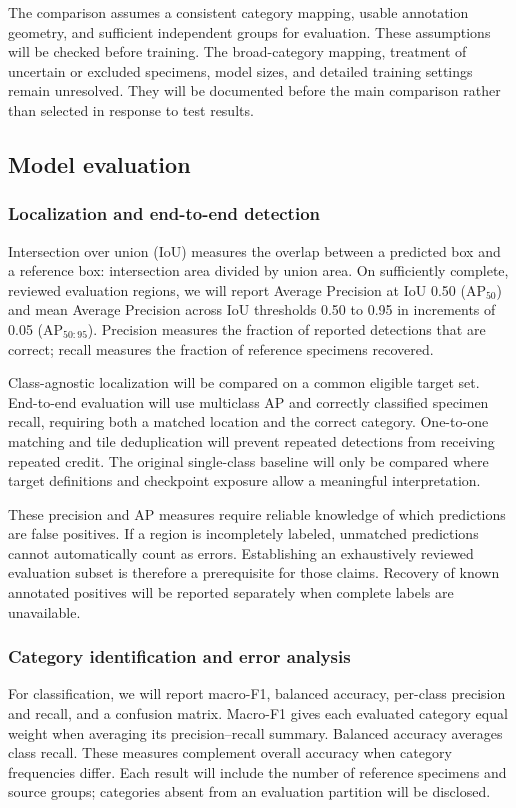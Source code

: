 \documentclass[11pt,letterpaper]{article}
\begin{document}
The comparison assumes a consistent category mapping, usable annotation geometry, and sufficient independent groups for evaluation. These assumptions will be checked before training. The broad-category mapping, treatment of uncertain or excluded specimens, model sizes, and detailed training settings remain unresolved. They will be documented before the main comparison rather than selected in response to test results.

\subsection{Model evaluation}
\subsubsection{Localization and end-to-end detection}
Intersection over union (IoU) measures the overlap between a predicted box and a reference box: intersection area divided by union area. On sufficiently complete, reviewed evaluation regions, we will report Average Precision at IoU 0.50 ($\mathrm{AP}_{50}$) and mean Average Precision across IoU thresholds 0.50 to 0.95 in increments of 0.05 ($\mathrm{AP}_{50:95}$). Precision measures the fraction of reported detections that are correct; recall measures the fraction of reference specimens recovered.

Class-agnostic localization will be compared on a common eligible target set. End-to-end evaluation will use multiclass AP and correctly classified specimen recall, requiring both a matched location and the correct category. One-to-one matching and tile deduplication will prevent repeated detections from receiving repeated credit. The original single-class baseline will only be compared where target definitions and checkpoint exposure allow a meaningful interpretation.

These precision and AP measures require reliable knowledge of which predictions are false positives. If a region is incompletely labeled, unmatched predictions cannot automatically count as errors. Establishing an exhaustively reviewed evaluation subset is therefore a prerequisite for those claims. Recovery of known annotated positives will be reported separately when complete labels are unavailable.

\subsubsection{Category identification and error analysis}
For classification, we will report macro-F1, balanced accuracy, per-class precision and recall, and a confusion matrix. Macro-F1 gives each evaluated category equal weight when averaging its precision--recall summary. Balanced accuracy averages class recall. These measures complement overall accuracy when category frequencies differ. Each result will include the number of reference specimens and source groups; categories absent from an evaluation partition will be disclosed.
\end{document}
